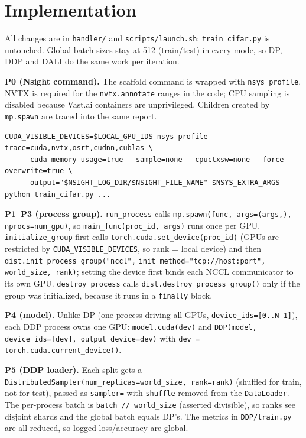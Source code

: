 \documentclass[11pt,a4paper]{article}
\begin{document}
\sloppy
\maketitleblock

\section{Implementation}

All changes are in \texttt{handler/} and \texttt{scripts/launch.sh}; \texttt{train\_cifar.py} is untouched.
Global batch sizes stay at 512 (train/test) in every mode, so DP, DDP and DALI do the same work per iteration.

\textbf{P0 (Nsight command).} The scaffold command is wrapped with \texttt{nsys profile}. NVTX is required for the
\texttt{nvtx.annotate} ranges in the code; CPU sampling is disabled because Vast.ai containers are unprivileged.
Children created by \texttt{mp.spawn} are traced into the same report.
\begin{lstlisting}
CUDA_VISIBLE_DEVICES=$LOCAL_GPU_IDS nsys profile --trace=cuda,nvtx,osrt,cudnn,cublas \
    --cuda-memory-usage=true --sample=none --cpuctxsw=none --force-overwrite=true \
    --output="$NSIGHT_LOG_DIR/$NSIGHT_FILE_NAME" $NSYS_EXTRA_ARGS python train_cifar.py ...
\end{lstlisting}

\textbf{P1--P3 (process group).} \texttt{run\_process} calls \texttt{mp.spawn(func, args=(args,), nprocs=num\_gpu)},
so \texttt{main\_func(proc\_id, args)} runs once per GPU. \texttt{initialize\_group} first calls
\texttt{torch.cuda.set\_device(proc\_id)} (GPUs are restricted by \texttt{CUDA\_VISIBLE\_DEVICES}, so rank = local device)
and then \texttt{dist.init\_process\_group("nccl",} \mbox{\texttt{init\_method="tcp://host:port",}} \texttt{world\_size, rank)}; setting the device
first binds each NCCL communicator to its own GPU. \texttt{destroy\_process} calls \texttt{dist.destroy\_process\_group()}
only if the group was initialized, because it runs in a \texttt{finally} block.

\textbf{P4 (model).} Unlike DP (one process driving all GPUs, \texttt{device\_ids=[0..N-1]}), each DDP process owns one GPU:
\texttt{model.cuda(dev)} and \texttt{DDP(model, device\_ids=[dev], output\_device=dev)} with \texttt{dev = torch.cuda.current\_device()}.

\textbf{P5 (DDP loader).} Each split gets a \texttt{DistributedSampler(num\_replicas=world\_size, rank=rank)} (shuffled for train,
not for test), passed as \texttt{sampler=} with \texttt{shuffle} removed from the \texttt{DataLoader}. The per-process batch is
\texttt{batch // world\_size} (asserted divisible), so ranks see disjoint shards and the global batch equals DP's.
The metrics in \texttt{DDP/train.py} are all-reduced, so logged loss/accuracy are global.
\end{document}
